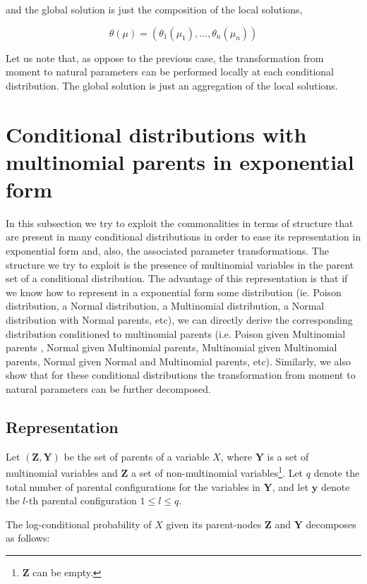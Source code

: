 \documentclass[11pt, oneside]{article}   	%
\newcommand{\bm}{\mathbf}
\numberwithin{figure}{section}
\numberwithin{equation}{section}
\numberwithin{table}{section}
\theoremstyle{definition}
\begin{document}
\noindent and the global solution is just the composition of the local solutions, 

$$ \theta(\mu) = (\theta_1(\mu_1), \ldots, \theta_n(\mu_n))$$

Let us note that, as oppose to the previous case, the transformation from moment to natural parameters can be performed locally at each conditional distribution. The global solution is just an aggregation of the local solutions.

\section{Conditional distributions with multinomial parents in exponential form}
\label{Section:CD_With_MParents}

In this subsection we try to exploit the commonalities in terms of structure that are present in many conditional distributions in order to ease its representation in exponential form and, also, the associated parameter transformations.  The structure we try to exploit is the presence of multinomial variables in the parent set of a conditional distribution. The advantage of this representation is that if we know how to represent in a exponential form some distribution (ie. Poison distribution, a Normal distribution, a Multinomial distribution, a Normal distribution with Normal parents, etc), we can directly derive the corresponding distribution conditioned to multinomial parents (i.e. Poison given Multinomial parents , Normal given Multinomial parents, Multinomial given Multinomial parents, Normal given Normal and Multinomial parents, etc). Similarly, we  also show that for these conditional distributions the transformation from moment to natural parameters can be further decomposed. 


\subsection{Representation}
\label{Section:CD_With_MParents:Representation}

Let $(\bm Z, \bm Y)$ be the set of parents of a variable $X$, where $\mathbf{Y}$ is a set of multinomial variables and $\bm Z$ a set of non-multinomial variables\footnote{$\bm Z$ can be empty.}.  Let $q$ denote the total number of parental configurations for the variables in $\bm Y$, and let $\bm y$ denote the $l$-th parental configuration $1 \leq l \leq q$.

The log-conditional probability of $X$ given its parent-nodes $\bm Z$ and $\mathbf{Y}$ decomposes as  follows:
\end{document}

